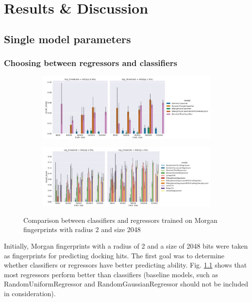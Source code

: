 \chapter{Results \& Discussion}
\section{Single model parameters}
\subsection{Choosing between regressors and classifiers}

\begin{figure}[h]
\centering
\begin{subfigure}{\textwidth}
\includegraphics[scale=0.25]{Images/MorganRadius2Size2048Classifier1.jpg} 
\end{subfigure}

\begin{subfigure}{\textwidth}
\includegraphics[scale=0.25]{Images/MorganRadius2Size2048Regressor1.jpg} 
\end{subfigure}
\caption{Comparison between classifiers and regressors trained on Morgan fingerprints with radius 2 and size 2048 }
\label{RegressorsVSClassifiers}
\end{figure}

Initially, Morgan fingerprints with a radius of 2 and a size of 2048 bits were taken 
as fingerprints for predicting docking hits.
The first goal was to determine whether classifiers or regressors have better predicting 
ability.
Fig. \ref{RegressorsVSClassifiers} shows that most regressors perform better than 
classifiers (baseline models, such as RandomUniformRegressor and RandomGaussianRegressor 
should not be included in consideration).

